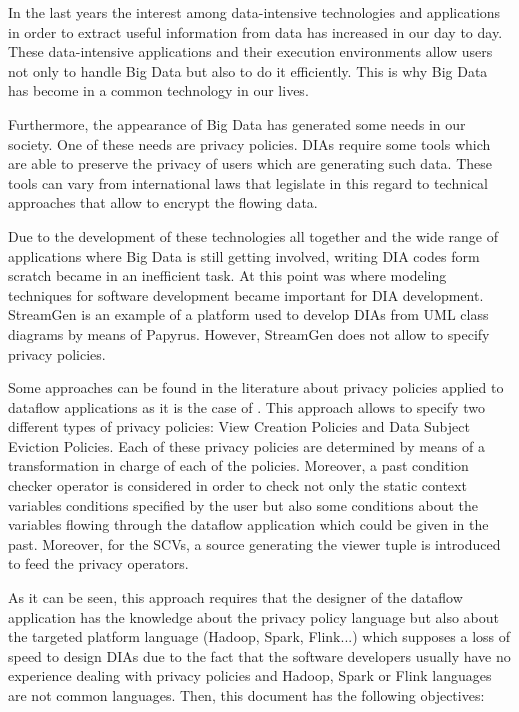 In the last years the interest among data-intensive technologies and applications in order to extract useful information from data has increased in our day to day. These data-intensive applications and their execution environments allow users not only to handle Big Data but also to do it efficiently. This is why Big Data has become in a common technology in our lives.

Furthermore, the appearance of Big Data has generated some needs in our society. One of these needs are privacy policies. DIAs require some tools which are able to preserve the privacy of users which are generating such data. These tools can vary from international laws that legislate in this regard to technical approaches that allow to encrypt the flowing data.

Due to the development of these technologies all together and the wide range of applications where Big Data is still getting involved, writing DIA codes form scratch became in an inefficient task. At this point was where modeling techniques for software development became important for DIA development. StreamGen is an example of a platform used to develop DIAs from UML class diagrams by means of Papyrus. However, StreamGen does not allow to specify privacy policies.

Some approaches can be found in the literature about privacy policies applied to dataflow applications as it is the case of \cite{privacypoliciesarticle}. This approach allows to specify two different types of privacy policies: View Creation Policies and Data Subject Eviction Policies. Each of these privacy policies are determined by means of a transformation in charge of each of the policies. Moreover, a past condition checker operator is considered in order to check not only the static context variables conditions specified by the user but also some conditions about the variables flowing through the dataflow application which could be given in the past. Moreover, for the SCVs, a source generating the viewer tuple is introduced to feed the privacy operators.

As it can be seen, this approach requires that the designer of the dataflow application has the knowledge about the privacy policy language but also about the targeted platform language (Hadoop, Spark, Flink...) which supposes a loss of speed to design DIAs due to the fact that the software developers usually have no experience dealing with privacy policies and Hadoop, Spark or Flink languages are not common languages. Then, this document has the following objectives:

